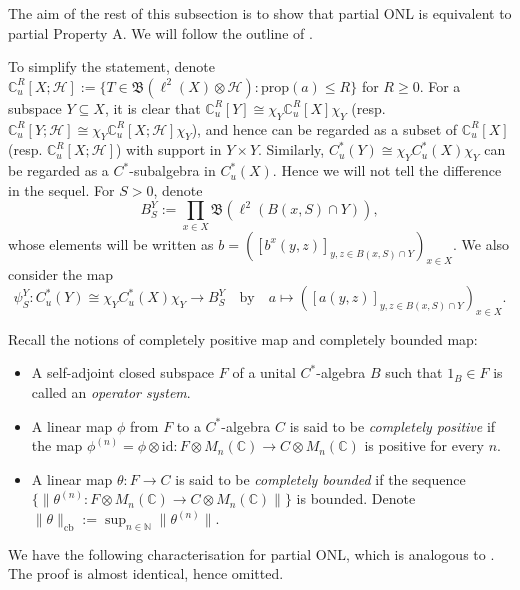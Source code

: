 \documentclass[12pt, a4paper]{amsart}
\numberwithin{equation}{section}
\theoremstyle{definition}
\theoremstyle{remark}
\def\NN{\mathbb{N}}
\def\CC{\mathbb{C}}
\def\H{\mathcal{H}}
\def\B{\mathfrak{B}}
\def\ppg{\mathrm{prop}}
\def\cb{\mathrm{cb}}
\begin{document}
The aim of the rest of this subsection is to show that partial ONL is equivalent to partial Property A. We will follow the outline of \cite{Sak14}. 

To simplify the statement, denote $\CC^R_u[X;\H]:=\{T \in \B(\ell^2(X) \otimes \H): \ppg(a) \leq R\}$ for $R \geq 0$. For a subspace $Y \subseteq X$, it is clear that $\CC^R_u[Y] \cong \chi_Y\CC^R_u[X] \chi_Y$ (resp. $\CC^R_u[Y;\H]\cong \chi_Y\CC^R_u[X;\H] \chi_Y$), and hence can be regarded as a subset of $\CC^R_u[X]$ (resp. $\CC^R_u[X;\H]$) with support in $Y \times Y$. Similarly, $C^*_u(Y) \cong \chi_Y C^*_u(X) \chi_Y$ can be regarded as a $C^*$-subalgebra in $C^*_u(X)$. Hence we will not tell the difference in the sequel. For $S>0$, denote
\[
B^Y_S:=\prod_{x\in X} \B(\ell^2(B(x,S) \cap Y)),
\]
whose elements will be written as $b=([b^{x}(y,z)]_{y,z\in B(x,S) \cap Y})_{x\in X}$. We also consider the map
\[
\psi_S^Y: C^*_u(Y) \cong \chi_Y C^*_u(X) \chi_Y \longrightarrow B^Y_S \quad \text{by} \quad  a \mapsto ([a(y,z)]_{y,z \in B(x,S) \cap Y})_{x\in X}.
\]

Recall the notions of completely positive map and completely bounded map:
\begin{itemize}
  \item A self-adjoint closed subspace $F$ of a unital $C^*$-algebra $B$ such that $1_B \in F$ is called an \emph{operator system}. 
  \item A linear map $\phi$ from $F$ to a $C^*$-algebra $C$ is said to be \emph{completely positive} if the map $\phi^{(n)} = \phi \otimes \mathrm{id}: F \otimes M_n(\CC) \to C \otimes M_n(\CC)$ is positive for every $n$.
  \item A linear map $\theta: F \to C$ is said to be \emph{completely bounded} if the sequence $\{\|\theta^{(n)}:F \otimes M_n(\CC) \to C \otimes M_n(\CC)\|\}$ is bounded. Denote $\|\theta\|_{\cb}:= \sup_{n\in \NN}\|\theta^{(n)}\|$.
\end{itemize}




We have the following characterisation for partial ONL, which is analogous to \cite[Proposition 3.1]{Sak14}. The proof is almost identical, hence omitted.
\end{document}
